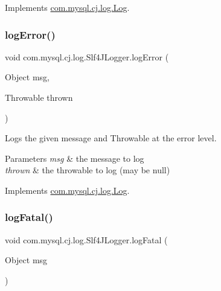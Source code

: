Implements \mbox{\hyperlink{interfacecom_1_1mysql_1_1cj_1_1log_1_1_log_ab6f35d1efab89f0c0316106fa4a15d2c}{com.\+mysql.\+cj.\+log.\+Log}}.

\mbox{\label{classcom_1_1mysql_1_1cj_1_1log_1_1_slf4_j_logger_a30a623739677aa264670ff888fff2958}} 
\subsubsection{\texorpdfstring{log\+Error()}{logError()}\hspace{0.1cm}{\footnotesize\ttfamily [2/2]}}
{\footnotesize\ttfamily void com.\+mysql.\+cj.\+log.\+Slf4\+J\+Logger.\+log\+Error (\begin{DoxyParamCaption}\item[{Object}]{msg,  }\item[{Throwable}]{thrown }\end{DoxyParamCaption})}

Logs the given message and Throwable at the \textquotesingle{}error\textquotesingle{} level.


\begin{DoxyParams}{Parameters}
{\em msg} & the message to log \\
\hline
{\em thrown} & the throwable to log (may be null) \\
\hline
\end{DoxyParams}


Implements \mbox{\hyperlink{interfacecom_1_1mysql_1_1cj_1_1log_1_1_log_a96aab6e63a2ab9ebe3b640b7e253dd4f}{com.\+mysql.\+cj.\+log.\+Log}}.

\mbox{\label{classcom_1_1mysql_1_1cj_1_1log_1_1_slf4_j_logger_a60d9438bd9dfae5451a25543e2d4584a}} 
\subsubsection{\texorpdfstring{log\+Fatal()}{logFatal()}\hspace{0.1cm}{\footnotesize\ttfamily [1/2]}}
{\footnotesize\ttfamily void com.\+mysql.\+cj.\+log.\+Slf4\+J\+Logger.\+log\+Fatal (\begin{DoxyParamCaption}\item[{Object}]{msg }\end{DoxyParamCaption})}

